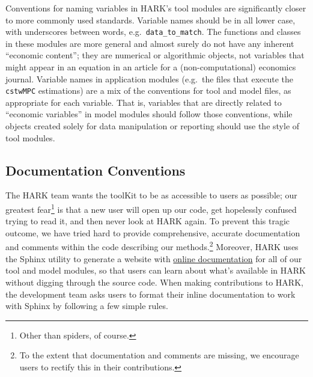 \documentclass[12pt,titlepage,letterpaper]{econtex}
\begin{document}
Conventions for naming variables in HARK's tool modules are significantly closer to more commonly used standards.  Variable names should be in all lower case, with underscores between words, e.g.\ \texttt{data\_to\_match}.  The functions and classes in these modules are more general and almost surely do not have any inherent ``economic content''; they are numerical or algorithmic objects, not variables that might appear in an equation in an article for a (non-computational) economics journal.  Variable names in application modules (e.g.\ the files that execute the \texttt{cstwMPC} estimations) are a mix of the conventions for tool and model files, as appropriate for each variable.  That is, variables that are directly related to ``economic variables'' in model modules should follow those conventions, while objects created solely for data manipulation or reporting should use the style of tool modules.

\subsection{Documentation Conventions}\label{sec:DocumentationConventions}

The HARK team wants the toolKit to be as accessible to users as possible; our greatest fear\footnote{Other than spiders, of course.} is that a new user will open up our code, get hopelessly confused trying to read it, and then never look at HARK again.  To prevent this tragic outcome, we have tried hard to provide comprehensive, accurate documentation and comments within the code describing our methods.\footnote{To the extent that documentation and comments are missing, we encourage users to rectify this in their contributions.}  Moreover, HARK uses the Sphinx utility to generate a website with \href{https://econ-ark.github.io/HARK/}{online documentation} for all of our tool and model modules, so that users can learn about what's available in HARK without digging through the source code.  When making contributions to HARK, the development team asks users to format their inline documentation to work with Sphinx by following a few simple rules.
\end{document}
